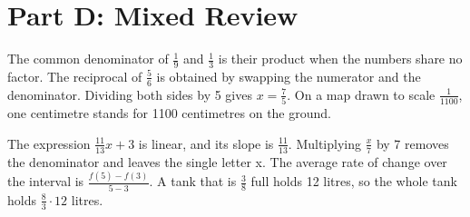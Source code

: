 \documentclass[11pt]{article}
\begin{document}
\section*{Part D: Mixed Review}
The common denominator of \label{eq066}$\frac{1}{9}$ and \label{eq067}$\frac{1}{3}$ is their product when the numbers share no factor. The reciprocal of \label{eq068}$\frac{5}{6}$ is obtained by swapping the numerator and the denominator. Dividing both sides by 5 gives \label{eq069}$x = \frac{7}{5}$. On a map drawn to scale \label{eq070}$\frac{1}{1100}$, one centimetre stands for 1100 centimetres on the ground.

The expression \label{eq071}$\frac{11}{13}x + 3$ is linear, and its slope is \label{eq072}$\frac{11}{13}$. Multiplying \label{eq073}$\frac{x}{7}$ by 7 removes the denominator and leaves the single letter x. The average rate of change over the interval is \label{eq074}$\frac{f(5) - f(3)}{5 - 3}$. A tank that is \label{eq075}$\frac{3}{8}$ full holds 12 litres, so the whole tank holds \label{eq076}$\frac{8}{3} \cdot 12$ litres.
\end{document}
